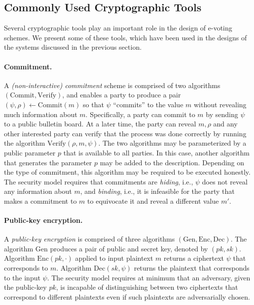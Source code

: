\subsection{Commonly Used Cryptographic Tools}

Several cryptographic tools play an important role in the design
of e-voting schemes. We present some of these tools, which have been
used in the designs of the systems discussed in the previous section.

\paragraph{Commitment.} A \emph{(non-interactive) commitment}
  scheme is comprised of two algorithms
$(\mathrm{Commit}, \mathrm{Verify})$, and enables a party to produce a
pair $(\psi, \rho) \leftarrow \mathrm{Commit}(m)$ so that $\psi$
``commits'' to the value $m$ without revealing much information about
$m$. Specifically, a party can commit to $m$ by sending $\psi$ to a
public bulletin board. At a later time, the party can reveal $m,\rho$
and any other interested party can verify that the process was done
correctly by running the algorithm $\mathrm{Verify}(\rho, m, \psi)$.
The two algorithms may be parameterized by a public parameter $p$ that
is available to all parties. In this case, another algorithm that
generates the parameter $p$ may be added to the description. Depending
on the type of commitment, this algorithm may be required to be
executed honestly. The security model requires that commitments are
\emph{hiding}, i.e., $\psi$ does not reveal any information about $m$,
and \emph{binding}, i.e., it is infeasible for the party that makes a
commitment to $m$ to equivocate it and reveal a different value $m'$.

\paragraph{Public-key encryption.} A \emph{public-key encryption} is
comprised of three algorithms
$(\mathrm{Gen},\mathrm{Enc}, \mathrm{Dec})$. The algorithm
$\mathrm{Gen}$ produces a pair of public and secret key, denoted by
$(pk,sk)$. Algorithm $\mathrm{Enc}(pk, \cdot )$ applied to input
plaintext $m$ returns a ciphertext $\psi$ that corresponds to $m$.
Algorithm $\mathrm{Dec}(sk, \psi )$ returns the plaintext that
corresponds to the input $\psi$. The security model requires at
minimum that an adversary, given the public-key $pk$, is incapable of
distinguishing between two ciphertexts that correspond to different
plaintexts even if such plaintexts are adversarially chosen.

